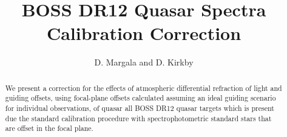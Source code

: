 \documentclass[preprint2]{aastex}
\begin{document}
\title{BOSS DR12 Quasar Spectra Calibration Correction}


\author{D. Margala and D. Kirkby}

\begin{abstract}
We present a correction for the effects of atmospheric differential refraction of light and guiding offsets, using focal-plane offsets calculated assuming an ideal guiding scenario for individual observations, of quasar all BOSS DR12 quasar targets which is present due the standard calibration procedure with spectrophotometric standard stars that are offset in the focal plane.
\end{abstract}





\end{document}
